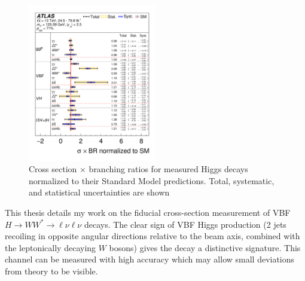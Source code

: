 \begin{figure}[H]
        \centering
    \includegraphics[width=0.5\textwidth] {Pictures/branchingratio.png}\hspace{1cm}
    \caption{Cross section $\times$ branching ratios for measured Higgs decays normalized to their Standard Model predictions. Total, systematic, and statistical uncertainties are shown \cite{HiggsCurrent}}
    \label{fig:branchingratio}
\end{figure}
This thesis details my work on the fiducial cross-section measurement of VBF $H\rightarrow WW^*\rightarrow\ell\nu\ell\nu$ decays. The clear sign of VBF Higgs production (2 jets recoiling in opposite angular directions relative to the beam axis, combined with the leptonically decaying $W$ bosons) gives the decay a distinctive signature. This channel can be measured with high accuracy which may allow small deviations from theory to be visible. 


